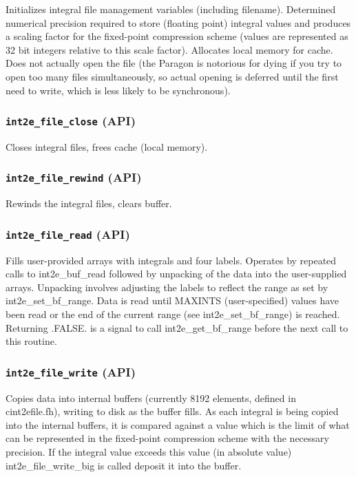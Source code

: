 Initializes integral file management variables (including filename).
Determined numerical precision required to store (floating point)
integral values and produces a scaling factor for the fixed-point
compression scheme (values are represented as 32 bit integers relative
to this scale factor).  Allocates local memory for cache.  Does not
actually open the file (the Paragon is notorious for dying if you try
to open too many files simultaneously, so actual opening is deferred
until the first need to write, which is less likely to be
synchronous).

\subsubsection{{\tt int2e\_file\_close} (API)}

Closes integral files, frees cache (local memory).

\subsubsection{{\tt int2e\_file\_rewind} (API)}

Rewinds the integral files, clears buffer.

\subsubsection{{\tt int2e\_file\_read} (API)}

Fills user-provided arrays with integrals and four labels.  Operates
by repeated calls to int2e\_buf\_read followed by unpacking of the data
into the user-supplied arrays.  Unpacking involves adjusting the
labels to reflect the range as set by int2e\_set\_bf\_range.  Data is
read until MAXINTS (user-specified) values have been read or the end
of the current range (see int2e\_set\_bf\_range) is reached.  Returning
.FALSE. is a signal to call int2e\_get\_bf\_range before the next call to
this routine.

\subsubsection{{\tt int2e\_file\_write} (API)}

Copies data into internal buffers (currently 8192 elements, defined in
cint2efile.fh), writing to disk as the buffer fills.  As each integral
is being copied into the internal buffers, it is compared against a
value which is the limit of what can be represented in the fixed-point
compression scheme with the necessary precision.  If the integral
value exceeds this value (in absolute value) int2e\_file\_write\_big is
called deposit it into the buffer.


